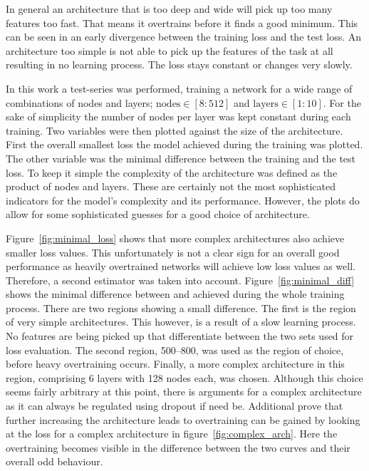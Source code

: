 In general an architecture that is too deep and wide will pick up too many features too fast. That means it overtrains before it finds a good minimum. This can be seen in an early divergence between the training loss and the test loss. An architecture too simple is not able to pick up the features of the task at all resulting in no learning process. The loss stays constant or changes very slowly.

In this work a test-series was performed, training a network for a wide range of combinations of nodes and layers; $\text{nodes}\in[8:512]$ and $\text{layers}\in[1:10]$. For the sake of simplicity the number of nodes per layer was kept constant during each training. Two variables were then plotted against the size of the architecture. First the overall smallest loss the model achieved during the training was plotted. The other variable was the minimal difference between the training and the test loss. To keep it simple the complexity of the architecture was defined as the product of nodes and layers. These are certainly not the most sophisticated indicators for the model's complexity and its performance. However, the plots do allow for some sophisticated guesses for a good choice of architecture.

Figure~\ref{fig:minimal_loss} shows that more complex architectures also achieve smaller loss values. This unfortunately is not a clear sign for an overall good performance as heavily overtrained networks will achieve low loss values as well. Therefore, a second estimator was taken into account. Figure~\ref{fig:minimal_diff} shows the minimal difference between \losstrain and \losstest achieved during the whole training process. There are two regions showing a small difference. The first is the region of very simple architectures. This however, is a result of a slow learning process. No features are being picked up that differentiate between the two sets used for loss evaluation. The second region, \numrange{500}{800}, was used as the region of choice, before heavy overtraining occurs. Finally, a more complex architecture in this region, comprising \num{6} layers with \num{128} nodes each, was chosen. Although this choice seems fairly arbitrary at this point, there is arguments for a complex architecture as it can always be regulated using dropout if need be. Additional prove that further increasing the architecture leads to overtraining can be gained by looking at the loss for a complex architecture in figure~\ref{fig:complex_arch}. Here the overtraining becomes visible in the difference between the two curves and their overall odd behaviour.



